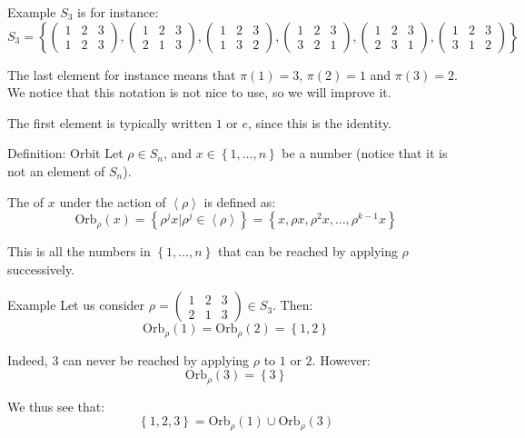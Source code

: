 \documentclass[a4paper]{article}
\begin{document}
\begin{parag}{Example}
    $S_3$ is for instance:
    \[S_3 = \left\{\begin{pmatrix} 1 & 2 & 3 \\ 1 & 2 & 3 \end{pmatrix} , \begin{pmatrix} 1 & 2 & 3 \\ 2 & 1 & 3 \end{pmatrix} , \begin{pmatrix}  1 & 2 & 3 \\1 & 3 & 2 \end{pmatrix} , \begin{pmatrix}  1 & 2 & 3 \\3 & 2 & 1 \end{pmatrix} , \begin{pmatrix}  1 & 2 & 3 \\2 & 3 & 1 \end{pmatrix} , \begin{pmatrix}  1 & 2 & 3 \\3 & 1 & 2 \end{pmatrix} \right\}\]
    
    The last element for instance means that $\pi\left(1\right) = 3$, $\pi\left(2\right) = 1$ and $\pi\left(3\right) = 2$. We notice that this notation is not nice to use, so we will improve it.


    The first element is typically written $1$ or $e$, since this is the identity.
\end{parag}

\begin{parag}{Definition: Orbit}
    Let $\rho \in S_n$, and $x \in \left\{1, \ldots, n\right\}$ be a number (notice that it is not an element of $S_n$).

    The  of $x$ under the action of $\left\langle \rho \right\rangle$ is defined as: 
    \[\text{Orb}_{\rho}\left(x\right) = \left\{\rho^j x | \rho^j \in \left\langle \rho \right\rangle\right\} = \left\{x, \rho x, \rho^2 x, \ldots, \rho^{k-1} x\right\}\]

    This is all the numbers in $\left\{1, \ldots, n\right\}$ that can be reached by applying $\rho$ successively.
    
    \begin{subparag}{Example}
        Let us consider $\rho = \begin{pmatrix} 1 & 2 & 3 \\ 2 & 1 & 3 \end{pmatrix} \in S_3$. Then: 
        \[\text{Orb}_{\rho}\left(1\right) = \text{Orb}_{\rho}\left(2\right) = \left\{1, 2\right\}\]
        
        Indeed, $3$ can never be reached by applying $\rho$ to $1$ or $2$. However: 
        \[\text{Orb}_{\rho}\left(3\right) = \left\{3\right\}\]

        We thus see that: 
        \[\left\{1, 2, 3\right\} = \text{Orb}_\rho\left(1\right) \cup \text{Orb}_{\rho}\left(3\right)\]
    \end{subparag}
\end{parag}
\end{document}
